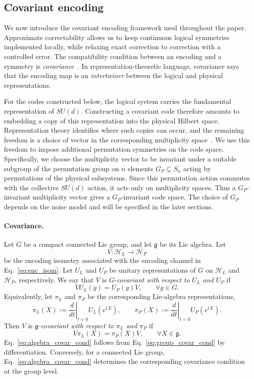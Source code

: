 \documentclass[10pt,twocolumn,superscriptaddress,aps,amsmath,amssymb,citeautoscript,floatfix,prx]{revtex4-2}
\newcounter{alg}
\theoremstyle{plain}
\theoremstyle{plain}
\theoremstyle{plain}
\theoremstyle{plain}
\theoremstyle{plain}
\theoremstyle{plain}
\begin{document}
\subsection{Covariant encoding}\label{subsec:main_covar_enc}

We now introduce the covariant encoding framework used throughout the paper. Approximate correctability allows us to keep continuous logical symmetries implemented locally, while relaxing exact correction to correction with a controlled error. The compatibility condition between an encoding and a symmetry is \textit{covariance}~\cite{Hayden2021}. In representation-theoretic language, covariance says that the encoding map is an \textit{intertwiner} between the logical and physical representations.

For the codes constructed below, the logical system carries the fundamental representation of $SU(d)$. Constructing a covariant code therefore amounts to embedding a copy of this representation into the physical Hilbert space. Representation theory identifies where such copies can occur, and the remaining freedom is a choice of vector in the corresponding multiplicity space~\cite{Denys2024}. We use this freedom to impose additional permutation symmetries on the code space. Specifically, we choose the multiplicity vector to be invariant under a suitable subgroup of the permutation group on $n$ elements $G_P\subseteq S_n$ acting by permutations of the physical subsystems. Since this permutation action commutes with the collective $SU(d)$ action, it acts only on multiplicity spaces. Thus a $G_P$-invariant multiplicity vector gives a $G_P$-invariant code space. The choice of $G_P$ depends on the noise model and will be specified in the later sections.

\paragraph{Covariance.}

Let $G$ be a compact connected Lie group, and let $\mathfrak g$ be its Lie algebra. Let
$$
V:\mathcal H_L\to\mathcal H_P
$$
be the encoding isometry associated with the encoding channel in Eq.~\eqref{eq:enc_isom}. Let $U_L$ and $U_P$ be unitary representations of $G$ on $\mathcal H_L$ and $\mathcal H_P$, respectively. We say that $V$ is $G$-\textit{covariant with respect to $U_L$ and $U_P$} if
\begin{equation}\label{eq:group_covar_cond}
VU_L(g)
=
U_P(g)V,
\qquad
\forall g\in G .
\end{equation}
Equivalently, let $\pi_L$ and $\pi_P$ be the corresponding Lie-algebra representations,
$$
\pi_L(X)
:=
\left.\frac{d}{dt}\right|_{t=0}
U_L(e^{tX}),
\qquad
\pi_P(X)
:=
\left.\frac{d}{dt}\right|_{t=0}
U_P(e^{tX}).
$$
Then $V$ is \textit{$\mathfrak g$-covariant with respect to $\pi_L$ and $\pi_P$} if
\begin{equation}\label{eq:algebra_covar_cond}
V\pi_L(X)
=
\pi_P(X)V,
\qquad
\forall X\in\mathfrak g .
\end{equation}
Eq.~\eqref{eq:algebra_covar_cond} follows from Eq.~\eqref{eq:group_covar_cond} by differentiation. Conversely, for a connected Lie group, Eq.~\eqref{eq:algebra_covar_cond} determines the corresponding covariance condition at the group level.
\end{document}
